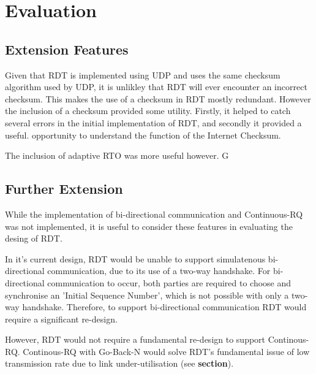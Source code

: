 \section{Evaluation}
\subsection{Extension Features}

Given that RDT is implemented using UDP and uses the same checksum algorithm used by UDP, it is unlikley that RDT will ever encounter an incorrect checksum. This makes the use of a checksum in RDT mostly redundant. However the inclusion of a checksum provided some utility. Firstly, it helped to catch several errors in the initial implementation of RDT, and secondly it provided a useful. opportunity to understand the function of the Internet Checksum.

The inclusion of adaptive RTO was more useful however. G

\subsection{Further Extension}

While the implementation of bi-directional communication and Continuous-RQ was not implemented, it is useful to consider these features in evaluating the desing of RDT.

In it's current design, RDT would be unable to support simulatenous bi-directional communication, due to its use of a two-way handshake. For bi-directional communication to occur, both parties are required to choose and synchronise an 'Initial Sequence Number', which is not possible with only a two-way handshake. Therefore, to support bi-directional communication RDT would require a significant re-design.

However, RDT would not require a fundamental re-design to support Continous-RQ. Continous-RQ with Go-Back-N would solve RDT's fundamental issue of low transmission rate due to link under-utilisation (see \textbf{section}).